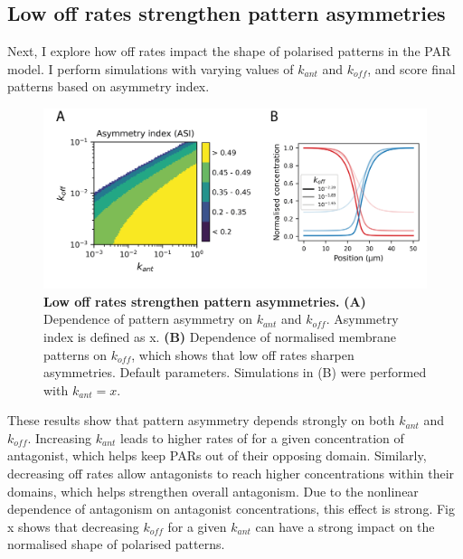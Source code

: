 \documentclass[12pt]{"report"}
\newcommand{\mycaption}[2]{\caption[#1]{\textbf{#1.} #2}}
\begin{document}


\clearpage
\subsection{Low off rates strengthen pattern asymmetries}

Next, I explore how off rates impact the shape of polarised patterns in the PAR model. I perform simulations with varying values of $k_{ant}$ and $k_{off}$, and score final patterns based on asymmetry index. \\

\begin{figure}
\includegraphics[scale=1]{goehring_model_kant_koff_asi}
\centering
\mycaption{Low off rates strengthen pattern asymmetries}{
\textbf{(A)} Dependence of pattern asymmetry on $k_{ant}$ and $k_{off}$. Asymmetry index is defined as x.
\textbf{(B)} Dependence of normalised membrane patterns on $k_{off}$, which shows that low off rates sharpen asymmetries. Default parameters. Simulations in (B) were performed with $k_{ant} = x$.
}
\label{fig:goehring_model_kant_koff_asi}
\end{figure}

These results show that pattern asymmetry depends strongly on both $k_{ant}$ and $k_{off}$. Increasing $k_{ant}$ leads to higher rates of for a given concentration of antagonist, which helps keep PARs out of their opposing domain. Similarly, decreasing off rates allow antagonists to reach higher concentrations within their domains, which helps strengthen overall antagonism. Due to the nonlinear dependence of antagonism on antagonist concentrations, this effect is strong. Fig x shows that decreasing $k_{off}$ for a given $k_{ant}$ can have a strong impact on the normalised shape of polarised patterns.\\
\end{document}
